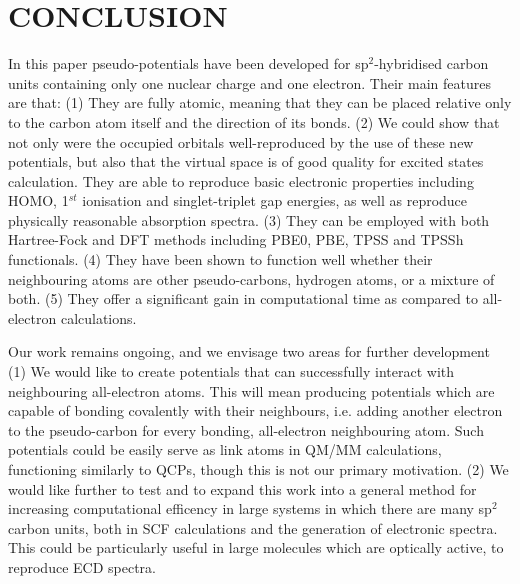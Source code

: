 \documentclass[12pt]{article}
\begin{document}
\section*{\sffamily \Large CONCLUSION}

In this paper pseudo-potentials have been developed for sp$^{2}$-hybridised carbon units containing only one nuclear charge and one electron. 
Their main features are that: 
(1) They are fully atomic, meaning that they can be placed relative only to the carbon atom itself and the direction of its bonds. 
(2) We could show that not only were the occupied orbitals well-reproduced by the use of these new potentials, but also that the virtual space is of good quality for excited states calculation. 
They are able to reproduce basic electronic properties including HOMO, 1$^{st}$ ionisation and singlet-triplet gap energies, as well as reproduce physically reasonable absorption spectra. 
(3) They can be employed with both Hartree-Fock and DFT methods including PBE0, PBE, TPSS and TPSSh functionals. 
(4) They have been shown to function well whether their neighbouring atoms are other pseudo-carbons, hydrogen atoms, or a mixture of both. 
(5) They offer a significant gain in computational time as compared to all-electron calculations.


Our work remains ongoing, and we envisage two areas for further development (1) We would like to create potentials that can successfully interact with neighbouring all-electron atoms. This will mean producing potentials which are capable of bonding covalently with their neighbours, i.e. adding another electron to the pseudo-carbon for every bonding, all-electron neighbouring atom. Such potentials could be easily serve as link atoms in QM/MM calculations, functioning similarly to QCPs, though this is not our primary motivation. (2) We would like further to test and to expand this work into a general method for increasing computational efficency in large systems in which there are many sp$^{2}$ carbon units, both in SCF calculations and the generation of electronic spectra. This could be particularly useful in large molecules which are optically active, to reproduce 
 ECD spectra.
\end{document}
